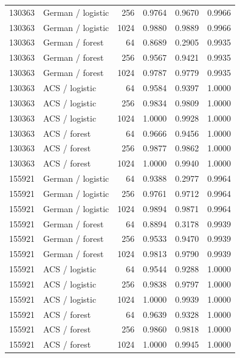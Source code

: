 \documentclass{article}
\begin{document}
\begin{longtable}{llrrrr}
130363 & German / logistic & 256 & 0.9764 & 0.9670 & 0.9966 \\
130363 & German / logistic & 1024 & 0.9880 & 0.9889 & 0.9966 \\
130363 & German / forest & 64 & 0.8689 & 0.2905 & 0.9935 \\
130363 & German / forest & 256 & 0.9567 & 0.9421 & 0.9935 \\
130363 & German / forest & 1024 & 0.9787 & 0.9779 & 0.9935 \\
130363 & ACS / logistic & 64 & 0.9584 & 0.9397 & 1.0000 \\
130363 & ACS / logistic & 256 & 0.9834 & 0.9809 & 1.0000 \\
130363 & ACS / logistic & 1024 & 1.0000 & 0.9928 & 1.0000 \\
130363 & ACS / forest & 64 & 0.9666 & 0.9456 & 1.0000 \\
130363 & ACS / forest & 256 & 0.9877 & 0.9862 & 1.0000 \\
130363 & ACS / forest & 1024 & 1.0000 & 0.9940 & 1.0000 \\
155921 & German / logistic & 64 & 0.9388 & 0.2977 & 0.9964 \\
155921 & German / logistic & 256 & 0.9761 & 0.9712 & 0.9964 \\
155921 & German / logistic & 1024 & 0.9894 & 0.9871 & 0.9964 \\
155921 & German / forest & 64 & 0.8894 & 0.3178 & 0.9939 \\
155921 & German / forest & 256 & 0.9533 & 0.9470 & 0.9939 \\
155921 & German / forest & 1024 & 0.9813 & 0.9790 & 0.9939 \\
155921 & ACS / logistic & 64 & 0.9544 & 0.9288 & 1.0000 \\
155921 & ACS / logistic & 256 & 0.9838 & 0.9797 & 1.0000 \\
155921 & ACS / logistic & 1024 & 1.0000 & 0.9939 & 1.0000 \\
155921 & ACS / forest & 64 & 0.9639 & 0.9328 & 1.0000 \\
155921 & ACS / forest & 256 & 0.9860 & 0.9818 & 1.0000 \\
155921 & ACS / forest & 1024 & 1.0000 & 0.9945 & 1.0000 \\
\bottomrule
\end{longtable}
\end{document}
